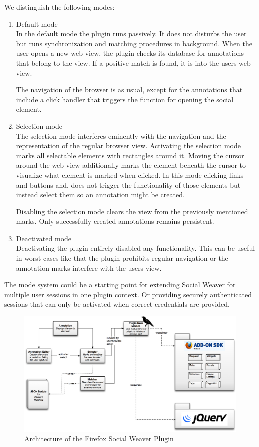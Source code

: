 We distinguish the following modes:
\begin{enumerate}
\item Default mode \\

In the default mode the plugin runs passively. It does
 not
 disturbs the user but runs synchronization and matching procedures in background. When the user opens a new web view, the plugin checks its database for annotations that belong to the view. If a positive match is found, it is into the users web view. 

The navigation of the browser is as usual, except for the annotations that include a click handler that triggers the function for opening the social element.

\item Selection mode \\ 

The selection mode interferes eminently with the navigation and the representation of the regular browser view. Activating the selection mode marks all selectable elements with rectangles around it. Moving the cursor around the web view additionally marks the element beneath the cursor to visualize what element is marked when clicked. 
In this  mode clicking links and buttons and, does
 not
 trigger the functionality of those elements but instead select them so an annotation might be created. 

Disabling the selection mode clears the view from the previously mentioned marks. Only successfully created annotations remains persistent. 

\item Deactivated mode \\ 

Deactivating the plugin entirely disabled any functionality. This can be useful in worst cases like that the plugin prohibits regular navigation or the annotation marks interfere with the users view.
\end{enumerate}

The mode system could be a starting point for extending Social Weaver for multiple user sessions in one plugin context. Or providing securely authenticated sessions that can only be activated when correct credentials are provided. 

\begin{figure}\centering
		\includegraphics[width=13cm]{images/plugin-architecture.png}
		\caption{Architecture of the Firefox Social Weaver Plugin}
		\label{plugin-architecture}
\end{figure} 

